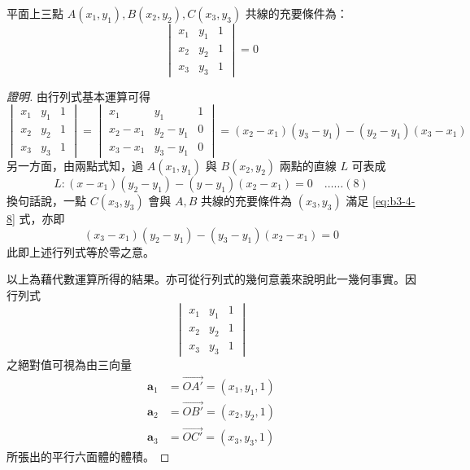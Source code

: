 \begin{example}[論例 3]
平面上三點 $A(x_1, y_1), B(x_2, y_2), C(x_3, y_3)$ 共線的充要條件為：
\[ \begin{vmatrix} x_1 & y_1 & 1 \\ x_2 & y_2 & 1 \\ x_3 & y_3 & 1 \end{vmatrix} = 0 \]
\end{example}

\begin{proof}[證明]
由行列式基本運算可得
\[ \begin{vmatrix} x_1 & y_1 & 1 \\ x_2 & y_2 & 1 \\ x_3 & y_3 & 1 \end{vmatrix} = \begin{vmatrix} x_1 & y_1 & 1 \\ x_2 - x_1 & y_2 - y_1 & 0 \\ x_3 - x_1 & y_3 - y_1 & 0 \end{vmatrix} = (x_2 - x_1)(y_3 - y_1) - (y_2 - y_1)(x_3 - x_1) \]
另一方面，由兩點式知，過 $A(x_1, y_1)$ 與 $B(x_2, y_2)$ 兩點的直線 $L$ 可表成
\[ L : (x - x_1)(y_2 - y_1) - (y - y_1)(x_2 - x_1) = 0 \quad\dots\dots (8) \]
換句話說，一點 $C(x_3, y_3)$ 會與 $A, B$ 共線的充要條件為 $(x_3, y_3)$ 滿足 \eqref{eq:b3-4-8} 式，亦即
\[ (x_3 - x_1)(y_2 - y_1) - (y_3 - y_1)(x_2 - x_1) = 0 \]
此即上述行列式等於零之意。

以上為藉代數運算所得的結果。亦可從行列式的幾何意義來說明此一幾何事實。因行列式
\[ \begin{vmatrix} x_1 & y_1 & 1 \\ x_2 & y_2 & 1 \\ x_3 & y_3 & 1 \end{vmatrix} \]
之絕對值可視為由三向量
\begin{align*}
\mathbf{a}_1 &= \vec{OA'} = (x_1, y_1, 1) \\
\mathbf{a}_2 &= \vec{OB'} = (x_2, y_2, 1) \\
\mathbf{a}_3 &= \vec{OC'} = (x_3, y_3, 1)
\end{align*}
所張出的平行六面體的體積。
\end{proof}


